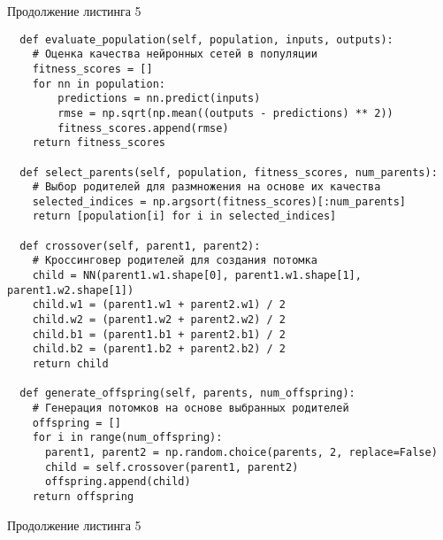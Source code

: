 \documentclass[12pt]{extarticle}
\begin{document}
\newpage

Продолжение листинга 5

\begin{lstlisting}
  def evaluate_population(self, population, inputs, outputs):
    # Оценка качества нейронных сетей в популяции
    fitness_scores = []
    for nn in population:
        predictions = nn.predict(inputs)
        rmse = np.sqrt(np.mean((outputs - predictions) ** 2))
        fitness_scores.append(rmse)
    return fitness_scores

  def select_parents(self, population, fitness_scores, num_parents):
    # Выбор родителей для размножения на основе их качества
    selected_indices = np.argsort(fitness_scores)[:num_parents]
    return [population[i] for i in selected_indices]

  def crossover(self, parent1, parent2):
    # Кроссинговер родителей для создания потомка
    child = NN(parent1.w1.shape[0], parent1.w1.shape[1], parent1.w2.shape[1])
    child.w1 = (parent1.w1 + parent2.w1) / 2
    child.w2 = (parent1.w2 + parent2.w2) / 2
    child.b1 = (parent1.b1 + parent2.b1) / 2
    child.b2 = (parent1.b2 + parent2.b2) / 2
    return child

  def generate_offspring(self, parents, num_offspring):
    # Генерация потомков на основе выбранных родителей
    offspring = []
    for i in range(num_offspring):
      parent1, parent2 = np.random.choice(parents, 2, replace=False)
      child = self.crossover(parent1, parent2)
      offspring.append(child)
    return offspring
\end{lstlisting}

\newpage

Продолжение листинга 5
\end{document}
